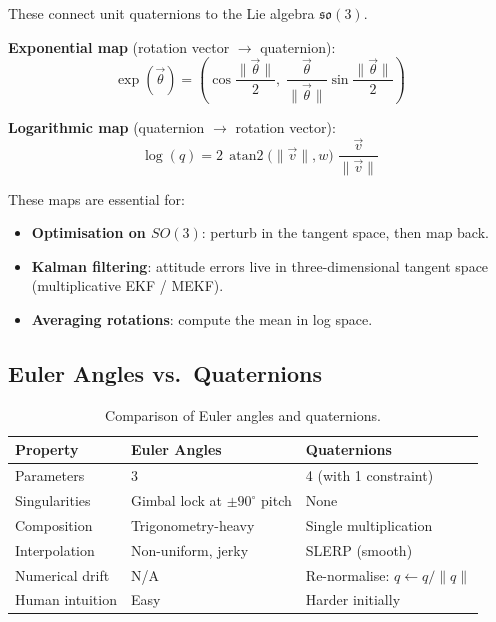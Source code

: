 \documentclass[12pt,a4paper]{article}
\begin{document}
These connect unit quaternions to the Lie algebra
$\mathfrak{so}(3)$.

\textbf{Exponential map} (rotation vector $\to$ quaternion):
\begin{equation}
  \exp(\vec{\theta})
  = \left(\cos\frac{\|\vec{\theta}\|}{2},\;
    \frac{\vec{\theta}}{\|\vec{\theta}\|}
    \sin\frac{\|\vec{\theta}\|}{2}\right)
\end{equation}

\textbf{Logarithmic map} (quaternion $\to$ rotation vector):
\begin{equation}
  \log(q)
  = 2\,\operatorname{atan2}\!\bigl(\|\vec{v}\|,w\bigr)\;
    \frac{\vec{v}}{\|\vec{v}\|}
\end{equation}

These maps are essential for:
\begin{itemize}
  \item \textbf{Optimisation on $SO(3)$}: perturb in the tangent space, then
        map back.
  \item \textbf{Kalman filtering}: attitude errors live in three-dimensional
        tangent space (multiplicative EKF / MEKF).
  \item \textbf{Averaging rotations}: compute the mean in log space.
\end{itemize}

\subsection{Euler Angles vs.\ Quaternions}

\begin{table}[h]
\centering
\begin{tabular}{@{}p{4cm}p{4.5cm}p{4.5cm}@{}}
\toprule
\textbf{Property} & \textbf{Euler Angles} & \textbf{Quaternions} \\
\midrule
Parameters        & 3                      & 4 (with 1 constraint) \\
Singularities     & Gimbal lock at $\pm90^\circ$ pitch & None \\
Composition       & Trigonometry-heavy     & Single multiplication \\
Interpolation     & Non-uniform, jerky     & SLERP (smooth) \\
Numerical drift   & N/A                    & Re-normalise: $q\leftarrow q/\|q\|$ \\
Human intuition   & Easy                   & Harder initially \\
\bottomrule
\end{tabular}
\caption{Comparison of Euler angles and quaternions.}
\end{table}
\end{document}
